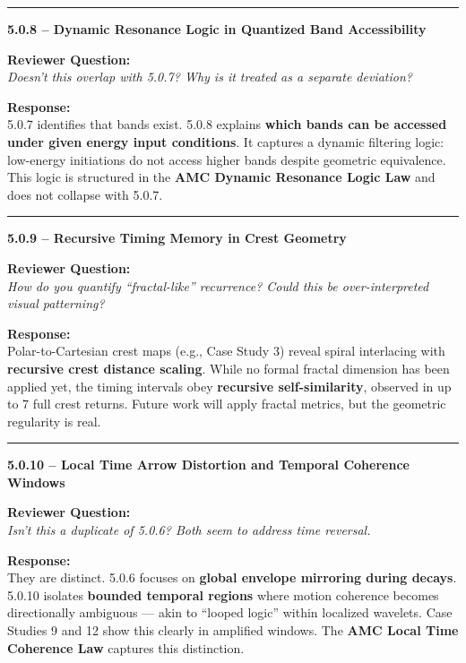 \documentclass[10pt,aps,pre,onecolumn,superscriptaddress,notitlepage]{revtex4-2}
\begin{document}
\vspace{1em}
\hrule
\vspace{1em}

\textbf{5.0.8 – Dynamic Resonance Logic in Quantized Band Accessibility}

\textbf{Reviewer Question:} \\
\textit{Doesn’t this overlap with 5.0.7? Why is it treated as a separate deviation?}

\textbf{Response:} \\
5.0.7 identifies that bands exist. 5.0.8 explains \textbf{which bands can be accessed under given energy input conditions}. It captures a dynamic filtering logic: low-energy initiations do not access higher bands despite geometric equivalence. This logic is structured in the \textbf{AMC Dynamic Resonance Logic Law} and does not collapse with 5.0.7.

\vspace{1em}
\hrule
\vspace{1em}

\textbf{5.0.9 – Recursive Timing Memory in Crest Geometry}

\textbf{Reviewer Question:} \\
\textit{How do you quantify “fractal-like” recurrence? Could this be over-interpreted visual patterning?}

\textbf{Response:} \\
Polar-to-Cartesian crest maps (e.g., Case Study 3) reveal spiral interlacing with \textbf{recursive crest distance scaling}. While no formal fractal dimension has been applied yet, the timing intervals obey \textbf{recursive self-similarity}, observed in up to 7 full crest returns. Future work will apply fractal metrics, but the geometric regularity is real.

\vspace{1em}
\hrule
\vspace{1em}

\textbf{5.0.10 – Local Time Arrow Distortion and Temporal Coherence Windows}

\textbf{Reviewer Question:} \\
\textit{Isn’t this a duplicate of 5.0.6? Both seem to address time reversal.}

\textbf{Response:} \\
They are distinct. 5.0.6 focuses on \textbf{global envelope mirroring during decays}. 5.0.10 isolates \textbf{bounded temporal regions} where motion coherence becomes directionally ambiguous — akin to “looped logic” within localized wavelets. Case Studies 9 and 12 show this clearly in amplified windows. The \textbf{AMC Local Time Coherence Law} captures this distinction.
\end{document}
